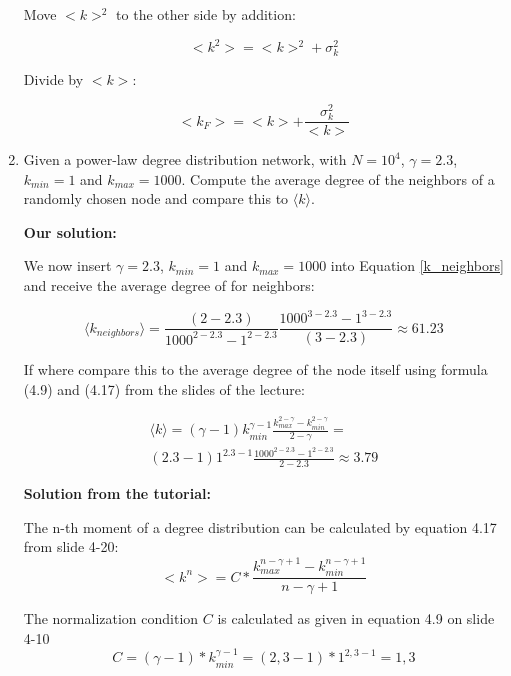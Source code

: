 \begin{enumerate}
	Move $<k>^2$ to the other side by addition:
	
	\begin{equation*}
		<k^2> = <k>^2 + \sigma_k^2
	\end{equation*}
	
	Divide by $<k>$:
	
	\begin{equation*}
		<k_F> = <k> + \frac{\sigma_k^2}{<k>}
	\end{equation*}
	
	\item Given a power-law degree distribution network, with $N = 10^4$, $\gamma = 2.3$, $k_{min} = 1$ and $k_{max} = 1000$. Compute the average degree of the neighbors of a randomly chosen node and compare this to $\langle k \rangle$.
	
	\textbf{Our solution:}
	
	We now insert $\gamma = 2.3$, $k_{min} = 1$ and $k_{max} = 1000$ into Equation \ref{k_neighbors} and receive the average degree of for neighbors:
	
	\begin{equation}
		\langle k_{neighbors} \rangle = \frac{(2-2.3)}{1000^{2-2.3} - 1^{2-2.3}} \frac{1000^{3-2.3} - 1^{3-2.3}}{(3-2.3)} \approx 61.23
	\end{equation}

	If where compare this to the average degree of the node itself using formula (4.9) and (4.17) from the slides of the lecture:
	
	\begin{equation} \label{k_neighbors}
		\begin{split}
			\langle k \rangle = (\gamma-1) k_{min}^{\gamma-1} \frac{k_{max}^{2-\gamma} - k_{min}^{2-\gamma}}{2-\gamma} = \\
			(2.3-1) 1^{2.3-1} \frac{1000^{2-2.3} - 1^{2-2.3}}{2-2.3} \approx 3.79
		\end{split}
	\end{equation}
	
	\textbf{Solution from the tutorial:}
	
	The n-th moment of a degree distribution can be calculated by equation 4.17 from slide 4-20:
	\begin{equation}
		<k^n> = C * \frac{k_{max}^{n-\gamma+1} - k_{min}^{n-\gamma+1}}{n - \gamma + 1}
	\end{equation}

	The normalization condition $C$ is calculated as given in equation 4.9 on slide 4-10
	\begin{equation}
		C = (\gamma - 1) * k_{min}^{\gamma - 1} = (2,3 - 1) * 1^{2,3 - 1} = 1,3
	\end{equation}
	

\end{enumerate}
